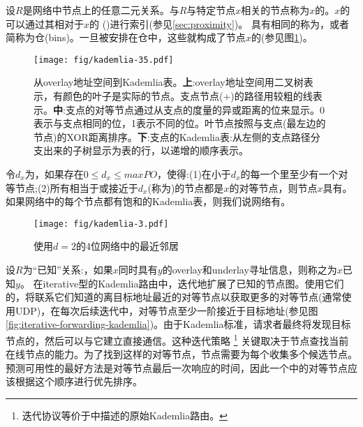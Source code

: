 设$R$是网络中节点上的任意二元关系。与$R$与特定节点$x$相关的节点称为$x$的。$x$的可以通过其相对于$x$的 ()进行索引(参见\ref{sec:proximity})。
具有相同的称为，或者简称为仓(bins)。一旦被安排在仓中，这些就构成了节点$x$的(参见图\ref{fig:kademlia-table})。 



\begin{figure}[htbp]
   \centering
    \texttt{[image: fig/kademlia-35.pdf]}
   \caption[从overlay地址空间到Kademlia表\statusgreen]{从overlay地址空间到Kademlia表。\textbf{上}:overlay地址空间用二叉树表示，有颜色的叶子是实际的节点。支点节点(+)的路径用较粗的线表示。\textbf{中}:支点的对等节点通过从支点的度量的异或距离的位来显示。0表示与支点相同的位，1表示不同的位。叶节点按照与支点(最左边的节点)的XOR距离排序。\textbf{下}:支点的Kademlia表:从左侧的支点路径分支出来的子树显示为表的行，以递增的顺序表示。}
   \label{fig:kademlia-table}
\end{figure}

令$d_x$为，如果存在$0\leq d_x\leq \mathit{maxPO}$，使得:(1)在小于$d_x$的每一个里至少有一个对等节点;(2)所有相当于或接近于$d_x$(称为)的节点都是$x$的对等节点，则节点$x$具有。如果网络中的每个节点都有饱和的Kademlia表，则我们说网络有。

\begin{figure}[htbp]
   \centering
    \texttt{[image: fig/kademlia-3.pdf]}
   \caption[最近的邻居\statusgreen]{使用$d = 2$的4位网络中的最近邻居 }
   \label{fig:bin-density}
\end{figure}

设$R$为“已知”关系:，如果$x$同时具有$y$的overlay和underlay寻址信息，则称之为$x$已知$y$。
在iterative型的Kademlia路由中，迭代地扩展了已知的节点图。使用它们的，将联系它们知道的离目标地址最近的对等节点以获取更多的对等节点(通常使用UDP)，在每次后续迭代中，对等节点至少一阶接近于目标地址(参见图\ref{fig:iterative-forwarding-kademlia})。由于Kademlia标准，请求者最终将发现目标节点的，然后可以与它建立直接通信。这种迭代策略%
%
\footnote{迭代协议等价于\cite{maymounkov2002kademlia}中描述的原始Kademlia路由。
}
%
关键取决于节点查找当前在线节点的能力。为了找到这样的对等节点，节点需要为每个收集多个候选节点。预测可用性的最好方法是对等节点最后一次响应的时间，因此一个中的对等节点应该根据这个顺序进行优先排序。

